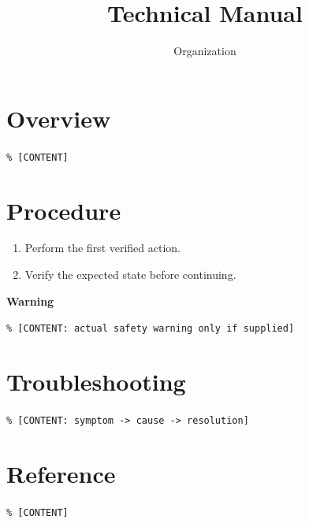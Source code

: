 \documentclass[11pt,a4paper]{scrbook}
\newenvironment{notice}[1]{\par\medskip\noindent\textbf{#1}\par\smallskip}{\par\medskip}
\begin{document}
\frontmatter\title{Technical Manual}\author{Organization}\maketitle\tableofcontents
\mainmatter\chapter{Overview}\texttt{\% [CONTENT]}
\chapter{Procedure}
\begin{enumerate}\item Perform the first verified action.\item Verify the expected state before continuing.\end{enumerate}
\begin{notice}{Warning}\texttt{\% [CONTENT: actual safety warning only if supplied]}\end{notice}
\chapter{Troubleshooting}\texttt{\% [CONTENT: symptom -> cause -> resolution]}
\chapter{Reference}\texttt{\% [CONTENT]}
\end{document}
